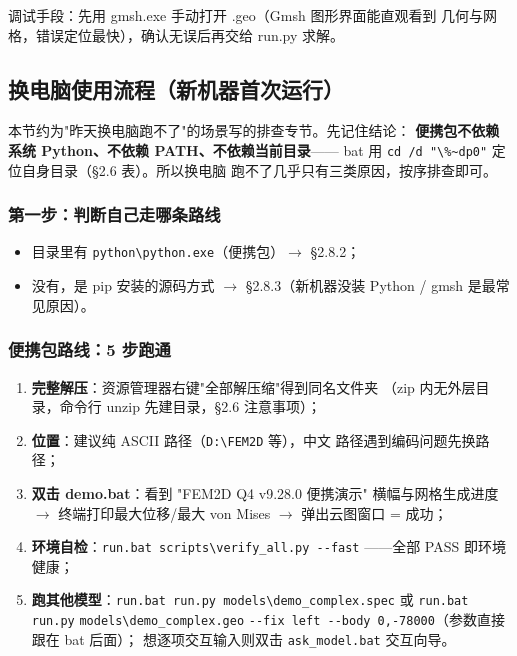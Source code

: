 \documentclass[12pt,a4paper]{ctexart}
\newcommand{\fem}{\Verb}
\begin{document}
调试手段：先用 gmsh.exe 手动打开 .geo（Gmsh 图形界面能直观看到
几何与网格，错误定位最快），确认无误后再交给 run.py 求解。

\subsection{换电脑使用流程（新机器首次运行）}

本节约为"昨天换电脑跑不了"的场景写的排查专节。先记住结论：
\textbf{便携包不依赖系统 Python、不依赖 PATH、不依赖当前目录}——
bat 用 \fem|cd /d "\%~dp0"| 定位自身目录（§2.6 表）。所以换电脑
跑不了几乎只有三类原因，按序排查即可。

\subsubsection{第一步：判断自己走哪条路线}

\begin{itemize}[leftmargin=*]
  \item 目录里有 \fem|python\python.exe|（便携包）$\rightarrow$ §2.8.2；
  \item 没有，是 pip 安装的源码方式 $\rightarrow$ §2.8.3（新机器没装
        Python / gmsh 是最常见原因）。
\end{itemize}

\subsubsection{便携包路线：5 步跑通}

\begin{enumerate}[leftmargin=*]
  \item \textbf{完整解压}：资源管理器右键"全部解压缩"得到同名文件夹
        （zip 内无外层目录，命令行 unzip 先建目录，§2.6 注意事项）；
  \item \textbf{位置}：建议纯 ASCII 路径（\fem|D:\FEM2D| 等），中文
        路径遇到编码问题先换路径；
  \item \textbf{双击 demo.bat}：看到 "FEM2D Q4 v9.28.0 便携演示"
        横幅与网格生成进度 $\rightarrow$ 终端打印最大位移/最大
        von Mises $\rightarrow$ 弹出云图窗口 = 成功；
  \item \textbf{环境自检}：\fem|run.bat scripts\verify_all.py --fast|
        ——全部 PASS 即环境健康；
  \item \textbf{跑其他模型}：\fem|run.bat run.py models\demo_complex.spec|
        或 \fem|run.bat run.py| \fem|models\demo_complex.geo|
        \fem|--fix left --body 0,-78000|（参数直接跟在 bat 后面）；
        想逐项交互输入则双击 \fem|ask_model.bat| 交互向导。
\end{enumerate}
\end{document}
